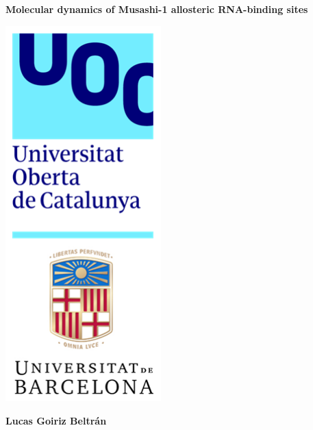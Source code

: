 \documentclass[a4paper,12pt]{article}
\newcommand{\thistitle}{Molecular dynamics of Musashi-1 allosteric RNA-binding sites}
\newcommand{\thisauthor}{Lucas Goiriz Beltrán}
\begin{document}

\colorbox{uoccyan}{\parbox{0.84\textwidth}{
    \vspace{1.2cm}
    \color{uocblue}\fontsize{40pt}{1cm}\textbf{\thistitle}
    \vspace{1cm}
}}

\vspace{1cm}

\begin{minipage}{\paperwidth}
    \begin{minipage}{0.35\paperwidth}
        \includegraphics[width=6cm]{assets/UOC_UB_logos}
    \end{minipage}
    \hspace{0.001\paperwidth}
    \begin{minipage}{0.45\paperwidth}
        \fontsize{24pt}{1cm}\textbf{\thisauthor}\\
        
        \vspace{0.5cm}
        

\end{minipage}
\end{minipage}
\end{document}
